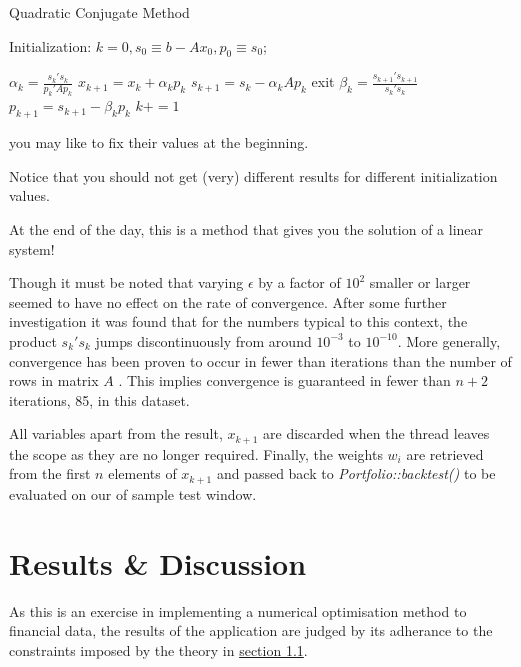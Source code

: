 \documentclass{article}
\begin{document}
\begin{algorithm}[H]
	\caption{Quadratic Conjugate Method} 
	
	Initialization: $k=0, s_0 \equiv b - Ax_0, p_0 \equiv s_0$;
	
	\begin{algorithmic}[1]
		\State $\alpha_k = \frac{s_{k}'s_{k}}{p_{k}'Ap_{k}}$
		\State $x_{k+1} = x_{k} + 	\alpha_kp_{k}$
		\State $s_{k+1} = s_{k} - 	\alpha_kAp_{k}$
		\State exit
		\EndIf
		\State $\beta_k = \frac{s_{k+1}'s_{k+1}}{s_{k}'s_{k}}$
		\State $p_{k+1} = s_{k+1} - 	\beta_kp_{k}$
		\State $k+=1$
		\EndWhile 
		
		
		you may like to fix their values at the beginning.
		
		Notice that you should not get (very) different results for different initialization values.
		
		At the end of the day, this is a method that gives you the solution of a linear system!
	\end{algorithmic} 
\end{algorithm}


Though it must be noted that varying $\epsilon$ by a factor of $10^2$ smaller or larger seemed to have no effect on the rate of convergence. After some further investigation it was found that for the numbers typical to this context, the product $s_{k}'s_{k}$ jumps discontinuously from around $10^{-3}$ to $10^{-10}$. More generally, convergence has been proven to occur in fewer than iterations than the number of rows in matrix $A$ \cite{qcm_convergence}. This implies convergence is guaranteed in fewer than $n+2$ iterations, 85, in this dataset.


All variables apart from the result, $x_{k+1}$ are discarded when the thread leaves the scope as they are no longer required. Finally, the weights $w_{i}$ are retrieved from the first $n$ elements of $x_{k+1}$ and passed back to \textit{Portfolio::backtest()} to be evaluated on our of sample test window. 




\section{Results \& Discussion}
\label{sec:results}


As this is an exercise in implementing a numerical optimisation method to financial data, the results of the application are judged by its adherance to the constraints imposed by the theory in \hyperref[sec:theory]{section 1.1}.
\end{document}

